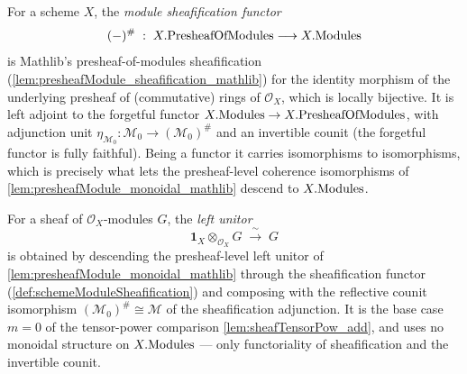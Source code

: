 \begin{definition}

  \label{def:schemeModuleSheafification}
  For a scheme \(X\), the \emph{module sheafification functor}
  \[
    (-)^{\#} \;:\; X.\mathrm{PresheafOfModules} \longrightarrow X.\mathrm{Modules}
  \]
  is Mathlib's presheaf-of-modules sheafification
  (\cref{lem:presheafModule_sheafification_mathlib}) for the identity morphism of
  the underlying presheaf of (commutative) rings of \(\mathcal{O}_X\), which is
  locally bijective. It is left adjoint to the forgetful functor
  \(X.\mathrm{Modules} \to X.\mathrm{PresheafOfModules}\), with adjunction unit
  \(\eta_{\mathcal{M}_0} : \mathcal{M}_0 \to (\mathcal{M}_0)^{\#}\) and an
  invertible counit (the forgetful functor is fully faithful). Being a functor it
  carries isomorphisms to isomorphisms, which is precisely what lets the
  presheaf-level coherence isomorphisms of
  \cref{lem:presheafModule_monoidal_mathlib} descend to \(X.\mathrm{Modules}\).
\end{definition}

\begin{definition}

  \label{def:tensorObjUnitIso}
  For a sheaf of \(\mathcal{O}_X\)-modules \(G\), the \emph{left unitor}
  \[
    \mathbf{1}_X \otimes_{\mathcal{O}_X} G \;\xrightarrow{\ \sim\ }\; G
  \]
  is obtained by descending the presheaf-level left unitor of
  \cref{lem:presheafModule_monoidal_mathlib} through the sheafification functor
  (\cref{def:schemeModuleSheafification}) and composing with the reflective counit
  isomorphism \((\mathcal{M}_0)^{\#} \cong \mathcal{M}\) of the sheafification
  adjunction. It is the base case \(m = 0\) of the tensor-power comparison
  \cref{lem:sheafTensorPow_add}, and uses no monoidal structure on
  \(X.\mathrm{Modules}\) --- only functoriality of sheafification and the invertible
  counit.
\end{definition}

